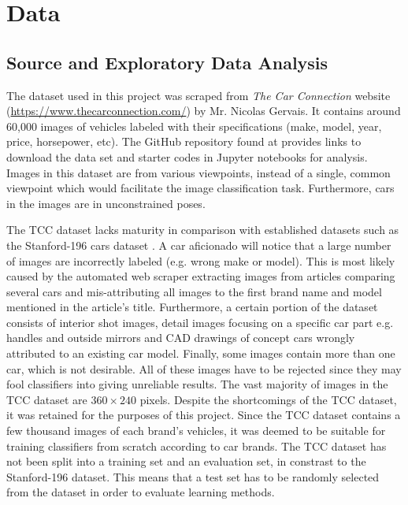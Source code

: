 \documentclass[conference]{IEEEtran}
\begin{document}
\section{Data} \label{section:data}
\subsection{Source and Exploratory Data Analysis}
The dataset used in this project was scraped from \textit{The Car Connection} website (\url{https://www.thecarconnection.com/}) by Mr. Nicolas Gervais. It contains around 60,000 images of vehicles labeled with their specifications (make, model, year, price, horsepower, etc). The GitHub repository found at \cite{githubrepo} provides links to download the data set and starter codes in Jupyter notebooks for analysis. Images in this dataset are from various viewpoints, instead of a single, common viewpoint which would facilitate the image classification task. Furthermore, cars in the images are in unconstrained poses. 

The TCC dataset lacks maturity in comparison with established datasets such as the Stanford-196 cars dataset \cite{KrauseStarkDengFei-Fei3DRR2013}. A car aficionado will notice that a large number of images are incorrectly labeled (e.g. wrong make or model). This is most likely caused by the automated web scraper extracting images from articles comparing several cars and mis-attributing all images to the first brand name and model mentioned in the article's title. Furthermore, a certain portion of the dataset consists of interior shot images, detail images focusing on a specific car part e.g. handles and outside mirrors and CAD drawings of concept cars wrongly attributed to an existing car model. Finally, some images contain more than one car, which is not desirable. All of these images have to be rejected since they may fool classifiers into giving unreliable results. The vast majority of images in the TCC dataset are $360 \times 240$ pixels. Despite the shortcomings of the TCC dataset, it was retained for the purposes of this project. Since the TCC dataset contains a few thousand images of each brand's vehicles, it was deemed to be suitable for training classifiers from scratch according to car brands. The TCC dataset has not been split into a training set and an evaluation set, in constrast to the Stanford-196 dataset. This means that a test set has to be randomly selected from the dataset in order to evaluate learning methods.
\end{document}
